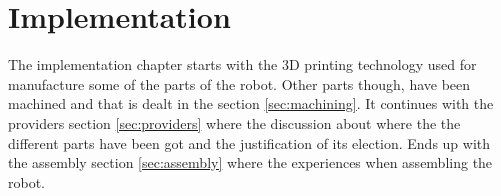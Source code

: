 \chapter{Implementation} %
\label{cha:implementation}
The implementation chapter starts with the 3D printing technology used for manufacture some of the parts of the robot. 
Other parts though, have been machined and that is dealt in the section \ref{sec:machining}.
It continues with the providers section \ref{sec:providers} where the discussion about where the the different parts have been got and the justification of its election.
Ends up with the assembly section \ref{sec:assembly} where the experiences when assembling the robot.








